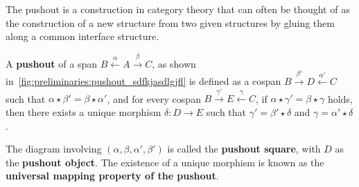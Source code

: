 The pushout is a construction in category theory that can often be thought of as the construction of a new structure from two given structures by gluing them along a common interface structure.
\begin{definition}
    \label{def:cat:po} 
    A \textbf{pushout} of a span \( B \overset{\alpha}{\leftarrow} A \overset{\beta}{\rightarrow} C \), as shown in~\autoref{fig:preliminaries:pushout_sdfkjasdlgjfl}
    is defined as a cospan \( B \overset{\beta'}{\rightarrow} D \overset{\alpha'}{\leftarrow} C \) such that \( \alpha \star \beta' = \beta \star \alpha' \), and for every cospan \( B \overset{\gamma'}{\rightarrow} E \overset{\gamma}{\leftarrow} C \), if \( \alpha \star \gamma' = \beta \star \gamma \) holds, then there exists a unique morphism \(\delta : D \to E\) such that \( \gamma' = \beta' \star \delta \) and \( \gamma = \alpha' \star \delta \).
    \begin{figure}[H]
        \centering
        \caption{}
        \label{fig:preliminaries:pushout_sdfkjasdlgjfl}
    \end{figure}
The diagram involving \( (\alpha, \beta, \alpha', \beta') \) is called the \textbf{pushout square}, with \(D\) as the \textbf{pushout object}. The existence of a unique morphism is known as the \textbf{universal mapping property of the pushout}.
\end{definition} 

